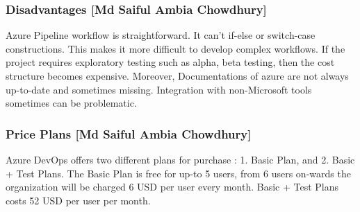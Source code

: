 \subsubsection{Disadvantages [Md Saiful Ambia Chowdhury]}
%
Azure Pipeline workflow is straightforward. It can’t if-else or switch-case constructions. This makes it more difficult to develop complex workflows. If the project requires exploratory testing such as alpha, beta testing, then the cost structure becomes expensive. Moreover, Documentations of azure are not always up-to-date and sometimes missing. Integration with non-Microsoft tools sometimes can be problematic. 

%

\subsubsection{Price Plans [Md Saiful Ambia Chowdhury]}
%
   Azure DevOps offers two different plans for purchase : 1. Basic Plan, and 2. Basic + Test Plans. The Basic Plan is free for up-to 5 users, from 6 users on-wards the organization will be charged 6 USD per user every month. Basic + Test Plans costs 52 USD per user per month. 
%